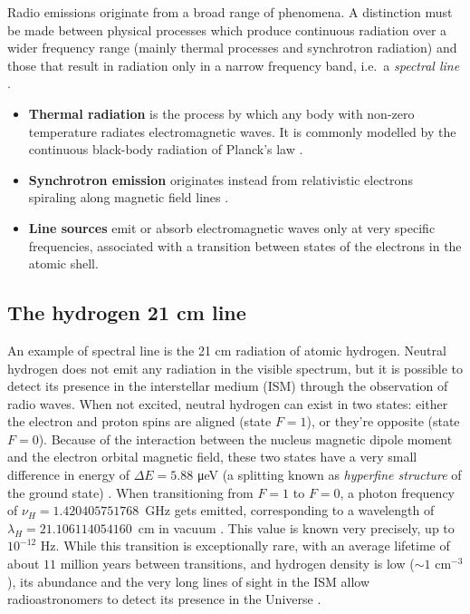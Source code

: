 Radio emissions originate from a broad range of phenomena.
A distinction must be made between physical processes which produce continuous radiation over a wider frequency range (mainly thermal processes and synchrotron radiation) and those that result in radiation only in a narrow frequency band, i.e.\ a \emph{spectral line} \cite{lauterbach_radio_2022}.
\begin{itemize}
    \item \textbf{Thermal radiation} is the process by which any body with non-zero temperature radiates electromagnetic waves. It is commonly modelled by the continuous black-body radiation of Planck's law \cite{carroll_introduction_2007}.
    \item \textbf{Synchrotron emission} originates instead from relativistic electrons spiraling along magnetic field lines \cite{maoz_astrophysics_2016}.
    \item \textbf{Line sources} emit or absorb electromagnetic waves only at very specific frequencies, associated with a transition between states of the electrons in the atomic shell.
\end{itemize}

\subsection{The hydrogen 21 cm line}
An example of spectral line is the 21 cm radiation of atomic hydrogen.
Neutral hydrogen does not emit any radiation in the visible spectrum, but it is possible to detect its presence in the interstellar medium (ISM) through the observation of radio waves.
When not excited, neutral hydrogen can exist in two states: either the electron and proton spins are aligned (state $F=1$), or they're opposite (state $F=0$).
Because of the interaction between the nucleus magnetic dipole moment and the electron orbital magnetic field, these two states have a very small difference in energy of $\Delta E = 5.88$ \si{\micro\electronvolt} (a splitting known as \emph{hyperfine structure} of the ground state) \cite{lauterbach_radio_2022}.
When transitioning from $F=1$ to $F=0$, a photon frequency of \mbox{$\nu_H = 1.420405751768$ GHz} gets emitted, corresponding to a wavelength of \mbox{$\lambda_H = 21.106114054160$ cm} in vacuum \cite{hellwig_measurement_1970}. This value is known very precisely, up to $10^{-12}$ Hz.
While this transition is exceptionally rare, with an average lifetime of about $11$ million years between transitions, and hydrogen density is low ($\sim 1$ cm$^{-3}$), its abundance and the very long lines of sight in the ISM allow radioastronomers to detect its presence in the Universe \cite{burke_introduction_2013}.

